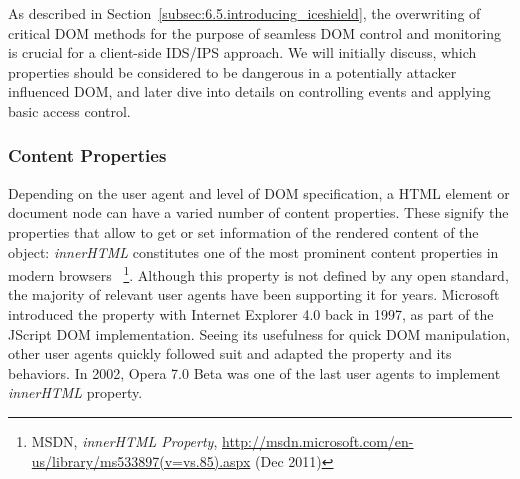       As described in Section~\ref{subsec:6.5.introducing_iceshield}, the overwriting of critical DOM methods for the purpose of seamless DOM control and monitoring is crucial for a client-side IDS/IPS approach. We will initially discuss, which properties should be considered to be dangerous in a potentially attacker influenced DOM, and later dive into details on controlling events and applying basic access control.

      \subsubsection{Content Properties}
      \label{subsubsubsec:6.6.4.1.content_properties}

      Depending on the user agent and level of DOM specification, a HTML element or document node can have a varied number of content properties. 
      These signify the properties that allow to get or set information of the rendered content of the object: \textit{innerHTML} constitutes one of the most prominent content properties in modern browsers ~\footnote{MSDN, \textit{innerHTML Property}, \url{http://msdn.microsoft.com/en-us/library/ms533897(v=vs.85).aspx} (Dec 2011)}. Although this property is not defined by any open standard, the majority of relevant user agents have been supporting it for years. Microsoft introduced the property with Internet Explorer 4.0 back in 1997, as part of the JScript DOM implementation. Seeing its usefulness for quick DOM manipulation, other user agents quickly followed suit and adapted the property and its behaviors. In 2002, Opera 7.0 Beta was one of the last user agents to implement \textit{innerHTML} property. \\

